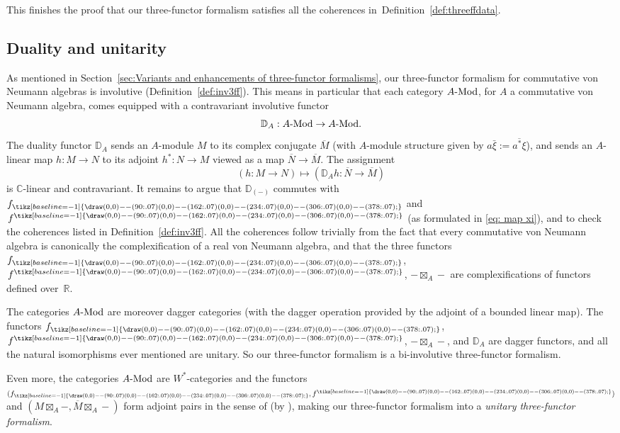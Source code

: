 \documentclass[10pt,a4paper,oneside]{amsart}
\theoremstyle{remark}
\theoremstyle{definition}
\newcommand{\lmod}[1]{#1\textnormal{-Mod}}
\newcommand{\vn}[1]{{#1}}
\newcommand{\res}[1]{#1^{\tikz[baseline=-1]{
\draw (0,0) -- (90:.07) (0,0) -- (162:.07) (0,0) -- (234:.07) (0,0) -- (306:.07)(0,0) -- (378:.07);
}}}
\newcommand{\vnres}[1]{\res{\vn{#1}}}
\newcommand{\ind}[1]{#1_{\tikz[baseline=-1]{
\draw (0,0) -- (90:.07) (0,0) -- (162:.07) (0,0) -- (234:.07) (0,0) -- (306:.07)(0,0) -- (378:.07);
}}}
\newcommand{\vnind}[1]{\ind{\vn{#1}}}
\begin{document}
This finishes the proof that our three-functor formalism satisfies all the coherences in~Definition~\ref{def:threeffdata}.



\subsection{Duality and unitarity}
As mentioned in Section~\ref{sec:Variants and enhancements of three-functor formalisms}, our three-functor formalism for commutative von Neumann algebras is involutive (Definition~\ref{def:inv3ff}). This means in particular that each category $\lmod{A}$, for $A$ a commutative von Neumann algebra, comes equipped with a contravariant involutive functor
\[
\mathbb D_A:\lmod{A}\to \lmod{A}.
\]
The duality functor $\mathbb D_A$ sends an $A$-module $M$ to its complex conjugate $\overline{M}$ (with $A$-module structure given by $a\bar \xi:=\overline{a^*\xi}$), and sends an $A$-linear map $h:M\to N$ to its adjoint $h^*:N\to M$ viewed as a map $\overline{N}\to \overline{M}$. The assignment 
\[
(h:M\to N)\mapsto (\mathbb D_Ah:\overline{N}\to \overline{M})
\]
is $\mathbb C$-linear and contravariant.
It remains to argue that $\mathbb D_{(-)}$ commutes with $\vnind f$ and $\vnres f$ (as formulated in \eqref{eq: map xi}), and to check the coherences listed in Definition~\ref{def:inv3ff}. All the coherences follow trivially from the fact that every commutative von Neumann algebra is canonically the complexification of a real von Neumann algebra, and that the three functors $\vnind f$, $\vnres f$, $-\boxtimes_A-$ are complexifications of functors defined over~$\mathbb R$.

The categories $\lmod{A}$ are moreover dagger categories (with the dagger operation provided by the adjoint of a bounded linear map).
The functors $\vnind{f}$, $\vnres{f}$, $-\boxtimes_A-$, and $\mathbb D_A$ are dagger functors,
and all the natural isomorphisms ever mentioned are unitary.
So our three-functor formalism is a bi-involutive three-functor formalism.

Even more, the categories $\lmod{A}$ are $W^*$-categories
and the functors $(\vnind{f},\vnres{f})$ and $(M\boxtimes_A -,\overline M \boxtimes_A -)$ form adjoint pairs in the sense of \cite[Def~4.14]{Henriques2024} (by \cite[Lem~4.16]{Henriques2024}), making our three-functor formalism into a \emph{unitary three-functor formalism}.
\end{document}
